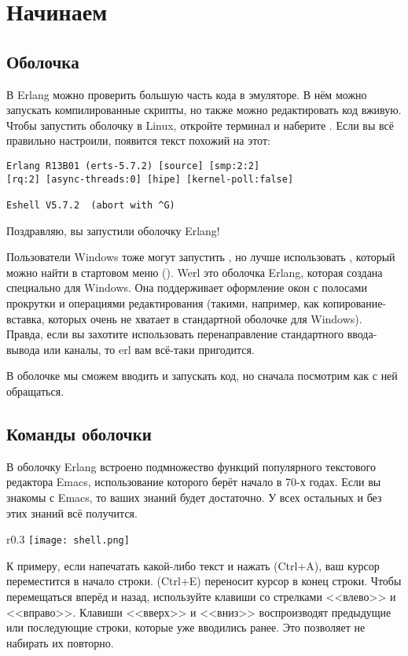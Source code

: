 \chapter{Начинаем}
\section{Оболочка}
В Erlang можно проверить большую часть кода в эмуляторе.
В нём можно запускать компилированные скрипты, но также можно редактировать код вживую.
Чтобы запустить оболочку в Linux, откройте терминал и наберите .
Если вы всё правильно настроили, появится текст похожий на этот: 
\begin{lstlisting}[style=repl]
Erlang R13B01 (erts-5.7.2) [source] [smp:2:2] 
[rq:2] [async-threads:0] [hipe] [kernel-poll:false] 
 
Eshell V5.7.2  (abort with ^G) 
\end{lstlisting}

Поздравляю, вы запустили оболочку Erlang! 

Пользователи Windows тоже могут запустить , но лучше использовать , который можно найти в стартовом меню ().
Werl это оболочка Erlang, которая создана специально для Windows.
Она поддерживает оформление окон с полосами прокрутки и операциями редактирования (такими, например, как копирование\--вставка, которых очень не хватает в стандартной оболочке  для Windows).
Правда, если вы захотите использовать перенаправление стандартного ввода\--вывода или каналы, то erl вам всё\--таки пригодится. 

В оболочке мы сможем вводить и запускать код, но сначала посмотрим как с ней обращаться.
\section{Команды оболочки}
В оболочку Erlang встроено подмножество функций популярного текстового редактора Emacs, использование которого берёт начало в 70\--х годах.
Если вы знакомы с Emacs, то ваших знаний будет достаточно.
У всех остальных и без этих знаний всё получится.

\begin{wrapfigure}{r}{0.3\linewidth}
    \texttt{[image: shell.png]}
\end{wrapfigure}
К примеру, если напечатать какой\--либо текст и нажать (Ctrl+A), ваш курсор переместится в начало строки.
(Ctrl+E) переносит курсор в конец строки.
Чтобы перемещаться вперёд и назад, используйте клавиши со стрелками <<влево>> и <<вправо>>.
Клавиши <<вверх>> и <<вниз>> воспроизводят предыдущие или последующие строки, которые уже вводились ранее. Это позволяет не набирать их повторно.


